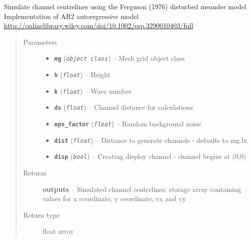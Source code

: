 \documentclass[letterpaper,10pt,english]{sphinxmanual}
\begin{document}
\begin{fulllineitems}
\label{hyvr:hyvr.hyvr.sim.ferguson_channel}
Simulate channel centrelines using the Ferguson (1976) disturbed meander model
Implementation of AR2 autoregressive model
\url{http://onlinelibrary.wiley.com/doi/10.1002/esp.3290010403/full}
\begin{quote}\begin{description}
\item[{Parameters}] \leavevmode\begin{itemize}
\item {} 
\textbf{\texttt{mg}} (\emph{\texttt{object class}}) -- Mesh grid object class

\item {} 
\textbf{\texttt{h}} (\emph{\texttt{float}}) -- Height

\item {} 
\textbf{\texttt{k}} (\emph{\texttt{float}}) -- Wave number

\item {} 
\textbf{\texttt{ds}} (\emph{\texttt{float}}) -- Channel distance for calculations

\item {} 
\textbf{\texttt{eps\_factor}} (\emph{\texttt{float}}) -- Random background noise

\item {} 
\textbf{\texttt{dist}} (\emph{\texttt{float}}) -- Distance to generate channels - defaults to mg.lx

\item {} 
\textbf{\texttt{disp}} (\emph{\texttt{bool}}) -- Creating display channel - channel begins at (0,0)

\end{itemize}

\item[{Returns}] \leavevmode
\textbf{outputs} -- Simulated channel centerlines: storage array containing values for x coordinate, y coordinate, vx and vy

\item[{Return type}] \leavevmode
float array

\end{description}\end{quote}

\end{fulllineitems}
\end{document}
